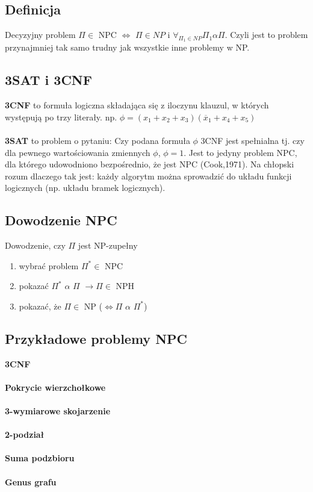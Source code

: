 \documentclass{article}
\begin{document}
\subsection{Definicja}
Decyzyjny problem $\Pi \in$ NPC $\iff$ $\Pi \in NP$ i $\forall_{\Pi_1 \in NP} \Pi_1 \alpha \Pi$. Czyli jest to problem
przynajmniej tak samo trudny jak wszystkie inne problemy w NP.

\subsection{3SAT i 3CNF}
\textbf{3CNF} to formuła logiczna składająca się z iloczynu klauzul, w których występują po trzy literały.
np. $\phi = (x_1 + x_2 + x_3)(\overline{x}_1 + x_4 + x_5)$ \\\\
\textbf{3SAT} to problem o pytaniu: Czy podana formuła $\phi$ 3CNF jest spełnialna tj. czy dla pewnego wartościowania zmiennych $\phi$, $\phi = 1$. Jest to jedyny problem NPC,  dla którego udowodniono bezpośrednio, 
że jest NPC (Cook,1971). Na chłopski rozum dlaczego tak jest: każdy algorytm można sprowadzić do
układu funkcji logicznych (np. układu bramek logicznych).

\subsection{Dowodzenie NPC}
Dowodzenie, czy $\Pi$ jest NP-zupełny
\begin{enumerate}
	\item wybrać problem $\Pi^* \in$ NPC
	\item pokazać $\Pi^*$ $\alpha$ $\Pi$ $\rightarrow \Pi \in$ NPH
	\item pokazać, że $\Pi \in$ NP ($\iff \Pi$ $\alpha$ $\Pi^*$)
\end{enumerate}

\subsection{Przykładowe problemy NPC}
\textbf{3CNF} \\\\
\textbf{Pokrycie wierzchołkowe} \\\\
\textbf{3-wymiarowe skojarzenie} \\\\
\textbf{2-podział} \\\\
\textbf{Suma podzbioru} \\\\
\textbf{Genus grafu}
\end{document}
